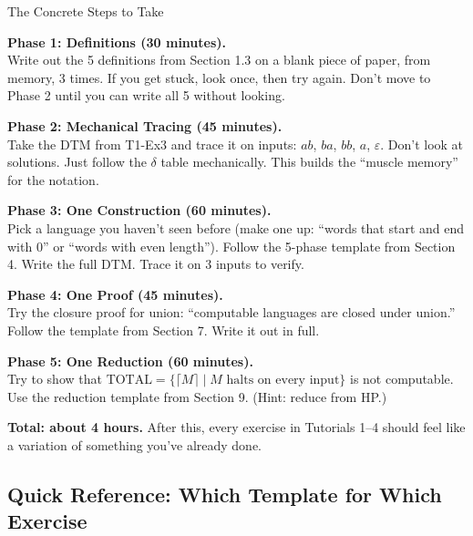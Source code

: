 \documentclass[11pt,a4paper]{article}
\begin{document}
\begin{conceptbox}{The Concrete Steps to Take}

\textbf{Phase 1: Definitions (30 minutes).}\\
Write out the 5 definitions from Section 1.3 on a blank piece of paper, from memory, 3 times. If you get stuck, look once, then try again. Don't move to Phase 2 until you can write all 5 without looking.

\textbf{Phase 2: Mechanical Tracing (45 minutes).}\\
Take the DTM from T1-Ex3 and trace it on inputs: $ab$, $ba$, $bb$, $a$, $\varepsilon$. Don't look at solutions. Just follow the $\delta$ table mechanically. This builds the ``muscle memory'' for the notation.

\textbf{Phase 3: One Construction (60 minutes).}\\
Pick a language you haven't seen before (make one up: ``words that start and end with 0'' or ``words with even length''). Follow the 5-phase template from Section 4. Write the full DTM. Trace it on 3 inputs to verify.

\textbf{Phase 4: One Proof (45 minutes).}\\
Try the closure proof for union: ``computable languages are closed under union.'' Follow the template from Section 7. Write it out in full.

\textbf{Phase 5: One Reduction (60 minutes).}\\
Try to show that $\text{TOTAL} = \{\lceil M \rceil \mid M \text{ halts on every input}\}$ is not computable. Use the reduction template from Section 9. (Hint: reduce from HP.)

\textbf{Total: about 4 hours.} After this, every exercise in Tutorials 1--4 should feel like a variation of something you've already done.
\end{conceptbox}

\subsection{Quick Reference: Which Template for Which Exercise}
\end{document}

